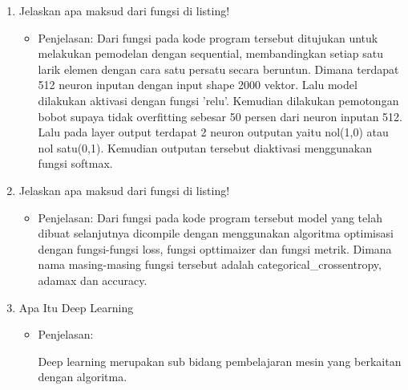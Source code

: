 \begin{enumerate}
\item Jelaskan apa maksud dari fungsi di listing!

\begin{itemize}
\item Penjelasan: Dari fungsi pada kode program tersebut ditujukan untuk melakukan pemodelan dengan sequential, membandingkan setiap satu larik elemen dengan cara satu persatu secara beruntun. Dimana terdapat 512 neuron inputan dengan input shape 2000 vektor. Lalu model dilakukan aktivasi dengan fungsi 'relu'. Kemudian dilakukan pemotongan bobot supaya tidak overfitting sebesar 50 persen dari neuron inputan 512. Lalu pada layer output terdapat 2 neuron outputan yaitu nol(1,0) atau nol satu(0,1). Kemudian outputan tersebut diaktivasi menggunakan fungsi softmax.
\par 
\end{itemize}
\par
\par

\item Jelaskan apa maksud dari fungsi di listing!

\begin{itemize}
\item Penjelasan: Dari fungsi pada kode program tersebut model yang telah dibuat selanjutnya dicompile dengan menggunakan algoritma optimisasi dengan fungsi-fungsi loss, fungsi opttimaizer dan fungsi metrik. Dimana nama masing-masing fungsi tersebut adalah categorical\_crossentropy, adamax dan accuracy.
\par 
\end{itemize}
\par
\par

\item 	Apa Itu Deep Learning
\begin{itemize}
\item Penjelasan: 
\par  Deep learning merupakan sub bidang pembelajaran mesin yang berkaitan dengan algoritma.
\end{itemize}
\par
\par


\end{enumerate}
